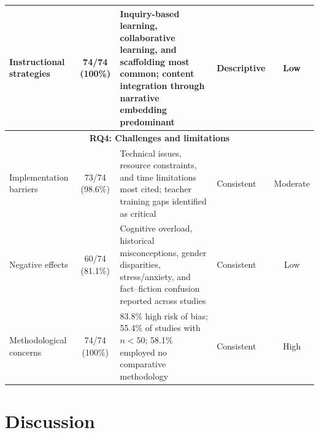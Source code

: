 \documentclass[a4paper,fleqn]{cas-sc}
\begin{document}
\begin{table}
\begin{tabularx}{\linewidth}{|l|c|X|p{}|c|}
\hline
Instructional strategies & 74/74 (100\%) & Inquiry-based learning, collaborative learning, and scaffolding most common; content integration through narrative embedding predominant & Descriptive & Low \\
\hline
\multicolumn{5}{|c|}{\textbf{RQ4: Challenges and limitations}} \\
\hline
Implementation barriers & 73/74 (98.6\%) & Technical issues, resource constraints, and time limitations most cited; teacher training gaps identified as critical & Consistent & Moderate \\
\hline
Negative effects & 60/74 (81.1\%) & Cognitive overload, historical misconceptions, gender disparities, stress/anxiety, and fact--fiction confusion reported across studies & Consistent & Low \\
\hline
Methodological concerns & 74/74 (100\%) & 83.8\% high risk of bias; 55.4\% of studies with $n<50$; 58.1\% employed no comparative methodology & Consistent & High \\
\hline
\end{tabularx}
\end{table}

\section{Discussion}

\label{sec:Discussion} 
\end{document}
